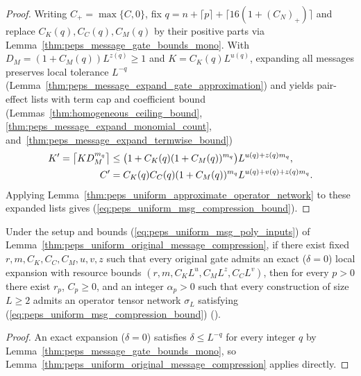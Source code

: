 \begin{proof}
    \leanok
    Writing $C_+=\max\{C,0\}$, fix $q=n+\lceil p\rceil+\lceil16(1+(C_N)_+)\rceil$ and replace $C_K(q),C_C(q),C_M(q)$ by their positive parts via Lemma~\ref{thm:peps_message_gate_bounds_mono}. With $D_M=(1+C_M(q))L^{z(q)}\ge1$ and $K=C_K(q)L^{u(q)}$, expanding all messages preserves local tolerance $L^{-q}$ (Lemma~\ref{thm:peps_message_expand_gate_approximation}) and yields pair-effect lists with term cap and coefficient bound (Lemmas~\ref{thm:homogeneous_ceiling_bound}, \ref{thm:peps_message_expand_monomial_count}, and~\ref{thm:peps_message_expand_termwise_bound})
    \begin{align}
        K'=\left\lceil KD_M^{m_q}\right\rceil
           & \le\bigl(1+C_K(q)(1+C_M(q))^{m_q}\bigr)L^{u(q)+z(q)m_q}, \notag \\
        C' & =C_K(q)C_C(q)(1+C_M(q))^{m_q}L^{u(q)+v(q)+z(q)m_q}.
        \notag
    \end{align}
    Applying Lemma~\ref{thm:peps_uniform_approximate_operator_network} to these expanded lists gives (\ref{eq:peps_uniform_msg_compression_bound}).
\end{proof}

\begin{lemma}
    \label{thm:peps_uniform_exact_original_message_compression}
    \leanok
    Under the setup and bounds (\ref{eq:peps_uniform_msg_poly_inputs}) of Lemma~\ref{thm:peps_uniform_original_message_compression}, if there exist fixed $r,m,C_K,C_C,C_M,u,v,z$ such that every original gate admits an exact ($\delta=0$) local expansion with resource bounds $(r,m,C_KL^u,C_ML^z,C_CL^v)$, then for every $p>0$ there exist $r_p$, $C_p\ge0$, and an integer $\alpha_p>0$ such that every construction of size $L\ge2$ admits an operator tensor network $\sigma_L$ satisfying (\ref{eq:peps_uniform_msg_compression_bound}) (\cite[Theorem~5.2]{OpenAI2026PolynomialPEPS}).
\end{lemma}
\begin{proof}
    \leanok
    An exact expansion ($\delta=0$) satisfies $\delta\le L^{-q}$ for every integer $q$ by Lemma~\ref{thm:peps_message_gate_bounds_mono}, so Lemma~\ref{thm:peps_uniform_original_message_compression} applies directly.
\end{proof}
